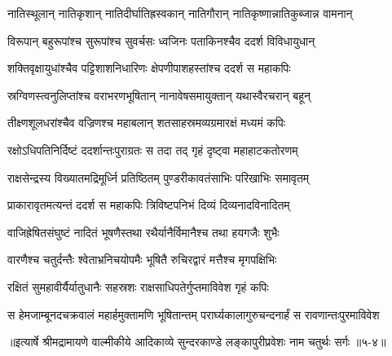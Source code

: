 \twolineshloka
{नातिस्थूलान् नातिकृशान् नातिदीर्घातिह्रस्वकान्}
{नातिगौरान् नातिकृष्णान्नातिकुब्जान्न वामनान्} %

\twolineshloka
{विरूपान् बहुरूपांश्च सुरूपांश्च सुवर्चसः}
{ध्वजिनः पताकिनश्चैव ददर्श विविधायुधान्} %

\twolineshloka
{शक्तिवृक्षायुधांश्चैव पट्टिशाशनिधारिणः}
{क्षेपणीपाशहस्तांश्च ददर्श स महाकपिः} %

\twolineshloka
{स्रग्विणस्त्वनुलिप्तांश्च वराभरणभूषितान्}
{नानावेषसमायुक्तान् यथास्वैरचरान् बहून्} %

\twolineshloka
{तीक्ष्णशूलधरांश्चैव वज्रिणश्च महाबलान्}
{शतसाहस्रमव्यग्रमारक्षं मध्यमं कपिः} %

\twolineshloka
{रक्षोऽधिपतिनिर्दिष्टं ददर्शान्तःपुराग्रतः}
{स तदा तद् गृहं दृष्ट्वा महाहाटकतोरणम्} %

\twolineshloka
{राक्षसेन्द्रस्य विख्यातमद्रिमूर्ध्नि प्रतिष्ठितम्}
{पुण्डरीकावतंसाभिः परिखाभिः समावृतम्} %

\twolineshloka
{प्राकारावृतमत्यन्तं ददर्श स महाकपिः}
{त्रिविष्टपनिभं दिव्यं दिव्यनादविनादितम्} %

\twolineshloka
{वाजिह्रेषितसंघुष्टं नादितं भूषणैस्तथा}
{रथैर्यानैर्विमानैश्च तथा हयगजैः शुभैः} %

\twolineshloka
{वारणैश्च चतुर्दन्तैः श्वेताभ्रनिचयोपमैः}
{भूषितै रुचिरद्वारं मत्तैश्च मृगपक्षिभिः} %

\twolineshloka
{रक्षितं सुमहावीर्यैर्यातुधानैः सहस्रशः}
{राक्षसाधिपतेर्गुप्तमाविवेश गृहं कपिः} %

\twolineshloka
{स हेमजाम्बूनदचक्रवालं महार्हमुक्तामणि भूषितान्तम्}
{परार्घ्यकालागुरुचन्दनार्हं स रावणान्तःपुरमाविवेश} %


॥इत्यार्षे श्रीमद्रामायणे वाल्मीकीये आदिकाव्ये सुन्दरकाण्डे लङ्कापुरीप्रवेशः नाम चतुर्थः सर्गः ॥५-४॥
